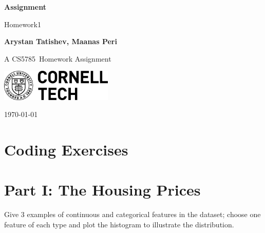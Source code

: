 \documentclass[10pt, a4paper]{article}
\newcommand\course{CS5785}                            %
\newcommand\hwnumber{1}                                 %
\newcommand\Information{Arystan Tatishev, Maanas Peri}                        %
\begin{document}
\begin{titlepage}
    \begin{center}
        \vspace*{3cm}
            
        \Huge
        \textbf{Assignment}
            
        \vspace{1cm}
        \huge
        Homework\hwnumber
            
        \vspace{1.5cm}
        \Large
            
        \textbf{\Information}                      %
        
            
        \vfill
        
        A \course \ Homework Assignment
            
        \vspace{1cm}
            
        \includegraphics[width=0.4\textwidth]{logo-ct.png}
        \\
        
        \Large
        
        \today
            
    \end{center}
\end{titlepage}

\newpage
\section*{Coding Exercises}
\section*{Part I: The Housing Prices}
\setcounter{Problem}{1}
\begin{Problem}
Give 3 examples of continuous and categorical features in the dataset; choose one feature of each type and plot the histogram to illustrate the distribution.
\end{Problem}
\end{document}
